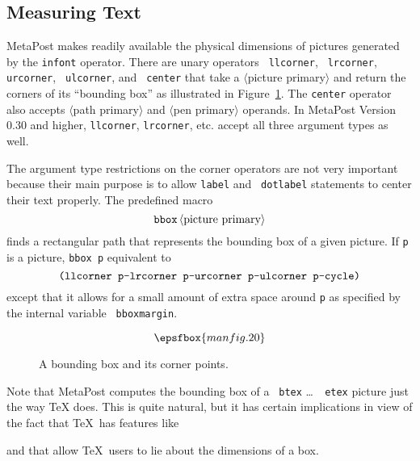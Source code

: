 \documentclass{article} %
\newcommand\descr[1]{{\langle\hbox{#1}\rangle}}
\newcommand\invisgap{\nobreak\hskip0pt\relax}
\newcommand\tdescr[1]{$\langle$\invisgap#1\invisgap$\rangle$}
\begin{document}
\subsection{Measuring Text}
\label{meas}

MetaPost makes readily available the physical dimensions of
pictures generated by the {\tt infont} operator.  There are unary
operators {\tt
llcorner}\label{Dcornop}, {\tt
lrcorner}, {\tt
urcorner}, {\tt
ulcorner}, and {\tt
center}\label{Dcenter} that take a \tdescr{picture
primary} and return the corners of its ``bounding box'' as illustrated
in Figure~\ref{bbox}.  The {\tt center} operator also accepts
\tdescr{path primary} and \tdescr{pen primary} operands.  In MetaPost
Version 0.30 and higher, {\tt llcorner}, {\tt lrcorner}, etc.  accept
all three argument types as well.

The argument type restrictions on the corner operators are not very
important because their main purpose is to allow {\tt label} and {\tt
dotlabel} statements to center their text properly.  The predefined
macro\label{Dbbox}
$$ {\tt bbox}\, \descr{picture primary} $$
finds a rectangular path that represents the bounding box of a given picture.
If {\tt p} is a picture, {\tt bbox p} equivalent to
$$ \hbox{\tt (llcorner p--lrcorner p--urcorner p--ulcorner p--cycle)} $$
except that it allows for a small amount of extra space around {\tt p}
as specified by the internal variable {\tt
bboxmargin}\label{Dbbmargin}.

\begin{figure}[htp]
$$ \epsfbox{manfig.20} $$
\caption{A bounding box and its corner points.}
\label{bbox}
\end{figure}

Note that MetaPost computes the bounding box of a {\tt
btex} \ldots\ {\tt
etex} picture just the way
\TeX{} does.  This is quite natural, but it has certain
implications in view of the fact that \TeX\ has features like
{\tt\string\strut} and
{\tt\string\rlap} that allow \TeX\ users
to lie about the dimensions of a box.
\end{document}
